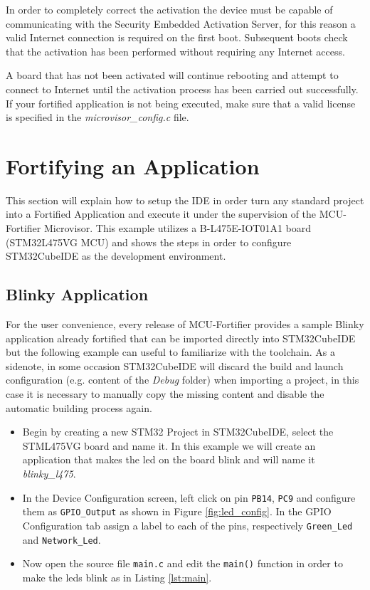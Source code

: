 \documentclass{article}
\begin{document}
In order to completely correct the activation the device must be capable of communicating with the Security Embedded Activation Server, for this reason a valid Internet connection is required on the first boot. Subsequent boots check that the activation has been performed without requiring any Internet access.

A board that has not been activated will continue rebooting and attempt to connect to Internet until the activation process has been carried out successfully. If your fortified application is not being executed, make sure that a valid license is specified in the \textit{microvisor\_config.c} file.


\section{Fortifying an Application}
This section will explain how to setup the IDE in order turn any standard project into a Fortified Application and execute it under the supervision of the MCU-Fortifier Microvisor. This example utilizes a B-L475E-IOT01A1 board (STM32L475VG MCU) and shows the steps in order to configure STM32CubeIDE as the development environment.

\subsection{Blinky Application}
For the user convenience, every release of MCU-Fortifier provides a sample Blinky application already fortified that can be imported directly into STM32CubeIDE but the following example can useful to familiarize with the toolchain. As a sidenote, in some occasion STM32CubeIDE will discard the build and launch configuration (e.g. content of the \textit{Debug} folder) when importing a project, in this case it is necessary to manually copy the missing content and disable the automatic building process again.
\begin{itemize}
    \item Begin by creating a new STM32 Project in STM32CubeIDE, select the STML475VG board and name it. In this example we will create an application that makes the led on the board blink and will name it \textit{blinky\_l475}.
    \item In the Device Configuration screen, left click on pin \verb|PB14|, \verb|PC9| and configure them as \verb|GPIO_Output| as shown in Figure \ref{fig:led_config}. In the GPIO Configuration tab assign a label to each of the pins, respectively \verb|Green_Led| and \verb|Network_Led|.
    \item Now open the source file \verb|main.c| and edit the \verb|main()| function in order to make the leds blink as in Listing \ref{lst:main}.
\end{itemize}
\end{document}
